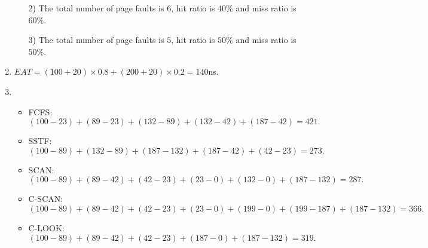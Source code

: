 \documentclass[12pt,a4paper]{article}
\begin{document}
\begin{enumerate}
\begin{enumerate}
				\item[2)] The total number of page faults is $6$, hit ratio is $40\%$ and miss ratio is $60\%$.
				
				\item[3)] The total number of page faults is $5$, hit ratio is $50\%$ and miss ratio is $50\%$.
			\end{enumerate}
		
		\item $EAT = (100+20) \times 0.8 + (200+20) \times 0.2 = 140$ns.
		
		\item 
			\begin{itemize}
				\item FCFS: $$(100 - 23) + (89 - 23) + (132 - 89) + (132 - 42) + (187 - 42) = 421.$$
				\item SSTF: $$(100 - 89) + (132 - 89) + (187 - 132) + (187 - 42) + (42 - 23) = 273.$$
				\item SCAN: $$(100 - 89) + (89 - 42) + (42 - 23) + (23 - 0) + (132 - 0) + (187 - 132) = 287.$$
				\item C-SCAN: $$(100 - 89) + (89 - 42) + (42 - 23) + (23 - 0) + (199 - 0) + (199 - 187) + (187 - 132) = 366.$$
				\item C-LOOK: $$(100 - 89) + (89 - 42) + (42 - 23) + (187 - 0) + (187 - 132) = 319.$$
			\end{itemize}
	\end{enumerate}
\end{document}
